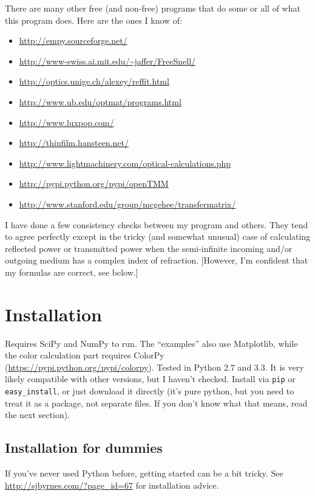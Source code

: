 \documentclass[12pt]{article}
\renewcommand{\(}{\left(}
\renewcommand{\)}{\right)}
\begin{document}
There are many other free (and non-free) programs that do some or all of what this program does. Here are the ones I know of:
\begin{itemize}
\item \url{http://empy.sourceforge.net/}
\item \url{http://www-swiss.ai.mit.edu/~jaffer/FreeSnell/}
\item \url{http://optics.unige.ch/alexey/reffit.html}
\item \url{http://www.ub.edu/optmat/programs.html}
\item \url{http://www.luxpop.com/}
\item \url{http://thinfilm.hansteen.net/}
\item \url{http://www.lightmachinery.com/optical-calculations.php}
\item \url{http://pypi.python.org/pypi/openTMM}
\item \url{http://www.stanford.edu/group/mcgehee/transfermatrix/}
\end{itemize}

I have done a few consistency checks between my program and others. They tend to agree perfectly except in the tricky (and somewhat unusual) case of calculating reflected power or transmitted power when the semi-infinite incoming and/or outgoing medium has a complex index of refraction. [However, I'm confident that my formulas are correct, see below.]

\section{Installation}

Requires SciPy and NumPy to run. The ``examples'' also use Matplotlib, while the color calculation part requires ColorPy (\url{https://pypi.python.org/pypi/colorpy}). Tested in Python 2.7 and 3.3. It is very likely compatible with other versions, but I haven't checked. Install via \verb=pip= or \verb=easy_install=, or just download it directly (it's pure python, but you need to treat it as a package, not separate files. If you don't know what that means, read the next section).

\subsection{Installation for dummies}

If you've never used Python before, getting started can be a bit tricky. See \url{http://sjbyrnes.com/?page_id=67} for installation advice.
\end{document}
